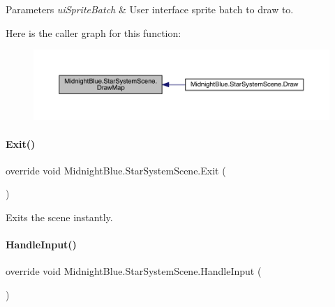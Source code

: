 \begin{DoxyParams}{Parameters}
{\em ui\+Sprite\+Batch} & User interface sprite batch to draw to.\\
\hline
\end{DoxyParams}
Here is the caller graph for this function\+:\nopagebreak
\begin{figure}[H]
\begin{center}
\leavevmode
\includegraphics[width=350pt]{class_midnight_blue_1_1_star_system_scene_a8ce5e552f65d43e0326644e069dc6c24_icgraph}
\end{center}
\end{figure}
\hypertarget{class_midnight_blue_1_1_star_system_scene_ad533ba93e597964d015099031a85cb77}{}\label{class_midnight_blue_1_1_star_system_scene_ad533ba93e597964d015099031a85cb77} 
\paragraph{\texorpdfstring{Exit()}{Exit()}}
{\footnotesize\ttfamily override void Midnight\+Blue.\+Star\+System\+Scene.\+Exit (\begin{DoxyParamCaption}{ }\end{DoxyParamCaption})\hspace{0.3cm}{\ttfamily [inline]}}



Exits the scene instantly. 

\hypertarget{class_midnight_blue_1_1_star_system_scene_a9fd64901322082a4da8658650257163d}{}\label{class_midnight_blue_1_1_star_system_scene_a9fd64901322082a4da8658650257163d} 
\paragraph{\texorpdfstring{Handle\+Input()}{HandleInput()}}
{\footnotesize\ttfamily override void Midnight\+Blue.\+Star\+System\+Scene.\+Handle\+Input (\begin{DoxyParamCaption}{ }\end{DoxyParamCaption})\hspace{0.3cm}{\ttfamily [inline]}}



